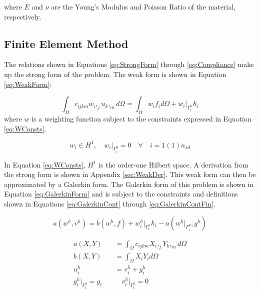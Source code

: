 \documentclass[a4paper, 12pt]{article}
\begin{document}
\noindent

\noindent
where $E$ and $\nu$ are the Young's Modulus and Poisson Ratio
of the material, respectively.

\subsection{Finite Element Method} \label{subsec:fem}
The relations shown in Equations \ref{eq:StrongForm} through
\ref{eq:Compliance} make up the strong form of the problem.
The weak form is shown in Equation \ref{eq:WeakForm}:

\begin{equation} \label{eq:WeakForm}
\int_{\Omega} c_{ijkm} w_{i},_{j} u_{k},_{m} d\Omega =
  \int_{\Omega} w_{i} f_{i} d\Omega +
  w_{i}\Big|_{\Gamma^{h}_{i}} h_{i}
\end{equation} 
\noindent
where $w$ is a weighting function subject to the constraints
expressed in Equation \ref{eq:WConsts}.

\begin{equation} \label{eq:WConsts}
w_{i} \in H^1,\quad w_{i}\Big|_{\Gamma^{g}_{i}} = 0
    \quad \forall \quad i=1(1)n_{sd}
\end{equation}

\noindent
In Equation \ref{eq:WConsts}, $H^{1}$ is the order-one Hilbert space.
A derivation from the strong form is shown in Appendix \ref{sec:WeakDer}.
This weak form can then be approximated by a Galerkin form. 
The Galerkin form of this problem is shown in Equation 
\ref{eq:GalerkinForm} and is subject to the constraints and definitions
shown in Equations \ref{eq:GalerkinCont}
through  \ref{eq:GalerkinContFin}.

\begin{equation} \label{eq:GalerkinForm}
a(w^{h} , v^{h})
  = b(w^{h} , f) 
  + w^{h}_{i}\Big|_{\Gamma^{h}_{i}} h_{i} 
  - a(w^{h}\Big|_{\Gamma^{g}_{i}} , g^{h})
\end{equation}

\begin{align} 
a( X, Y ) &= 
  \int_{\Omega} c_{ijkm} X_{i},_{j} Y_{k},_{m} d\Omega 
    \label{eq:GalerkinCont}                                           \\
b( X, Y ) &= 
  \int_{\Omega} X_{i} Y_{i} d\Omega 
    \label{eq:GalerkinForce}                                          \\
u^{h}_{i} &= 
  v^{h}_{i} + g^{h}_{i} 
  \label{eq:GalerkinUh}                                               \\
g^{h}_{i}\Big|_{\Gamma^{g}_{i}} = g_{i} 
  \quad & \quad
  v^{h}_{i}\Big|_{\Gamma^{g}_{i}} = 0
  \label{eq:GalerkinContFin}                                       %
\end{align}
\end{document}
